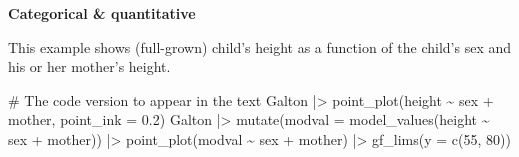 \documentclass[
  letterpaper,
  DIV=11,
  numbers=noendperiod,
  oneside]{scrartcl}
\newenvironment{Shaded}{\begin{snugshade}}{\end{snugshade}}
\newcommand{\AttributeTok}[1]{\textcolor[rgb]{0.40,0.45,0.13}{#1}}
\newcommand{\CommentTok}[1]{\textcolor[rgb]{0.37,0.37,0.37}{#1}}
\newcommand{\DecValTok}[1]{\textcolor[rgb]{0.68,0.00,0.00}{#1}}
\newcommand{\FloatTok}[1]{\textcolor[rgb]{0.68,0.00,0.00}{#1}}
\newcommand{\FunctionTok}[1]{\textcolor[rgb]{0.28,0.35,0.67}{#1}}
\newcommand{\NormalTok}[1]{\textcolor[rgb]{0.00,0.23,0.31}{#1}}
\newcommand{\SpecialCharTok}[1]{\textcolor[rgb]{0.37,0.37,0.37}{#1}}
\begin{document}
\textbf{Categorical \& quantitative}

This example shows (full-grown) child's height as a function of the
child's sex and his or her mother's height.

\begin{Shaded}
\begin{Highlighting}[]
\CommentTok{\# The code version to appear in the text}
\NormalTok{Galton }\SpecialCharTok{|\textgreater{}} 
  \FunctionTok{point\_plot}\NormalTok{(height }\SpecialCharTok{\textasciitilde{}}\NormalTok{ sex }\SpecialCharTok{+}\NormalTok{ mother, }\AttributeTok{point\_ink =} \FloatTok{0.2}\NormalTok{)}
\NormalTok{Galton }\SpecialCharTok{|\textgreater{}} 
  \FunctionTok{mutate}\NormalTok{(}\AttributeTok{modval =} \FunctionTok{model\_values}\NormalTok{(height }\SpecialCharTok{\textasciitilde{}}\NormalTok{ sex }\SpecialCharTok{+}\NormalTok{ mother)) }\SpecialCharTok{|\textgreater{}}
  \FunctionTok{point\_plot}\NormalTok{(modval }\SpecialCharTok{\textasciitilde{}}\NormalTok{ sex }\SpecialCharTok{+}\NormalTok{ mother) }\SpecialCharTok{|\textgreater{}}
  \FunctionTok{gf\_lims}\NormalTok{(}\AttributeTok{y =} \FunctionTok{c}\NormalTok{(}\DecValTok{55}\NormalTok{, }\DecValTok{80}\NormalTok{))}
\end{Highlighting}
\end{Shaded}
\end{document}
